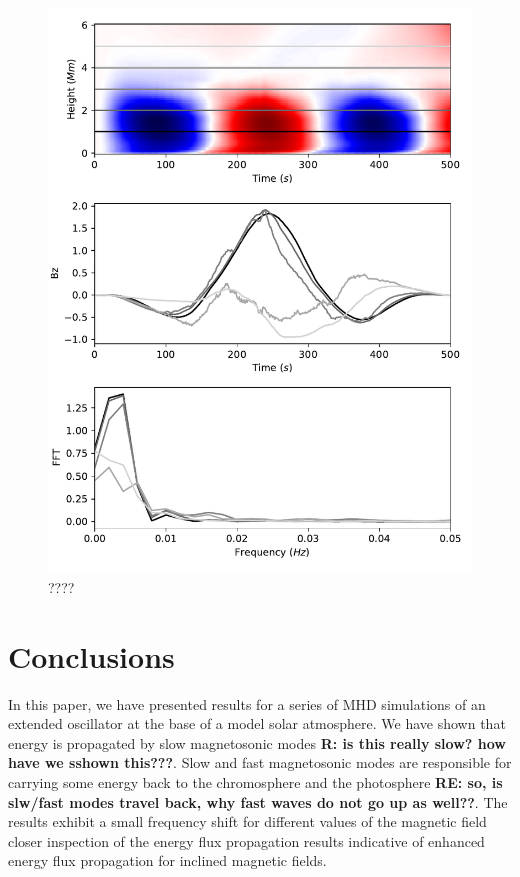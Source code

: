 \documentclass{aastex62}
\begin{document}
\begin{figure}
    \label{fft_obs}
    \includegraphics[scale=0.6]{imrescale/fft_sim.pdf}
    \caption{????}
\end{figure}















\section{Conclusions}

In this paper, we have presented results for a series of MHD simulations of an extended oscillator at the base of a model solar atmosphere. We have shown that energy is propagated by slow magnetosonic modes {\bf R: is this really slow? how have we sshown this???}. Slow and fast magnetosonic modes are responsible for carrying some energy back to the chromosphere and the photosphere {\bf RE: so, is slw/fast modes travel back, why fast waves do not go up as well??}. The results exhibit a small frequency shift  for different values of the magnetic field closer inspection of the energy flux propagation results indicative of enhanced energy flux propagation for inclined magnetic fields.
\end{document}
